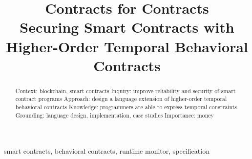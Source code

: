 \documentclass[10pt,conference]{IEEEtran}
\begin{document}
\title{Contracts for Contracts \\
  {\Large Securing Smart Contracts with Higher-Order Temporal Behavioral Contracts}
}

\author{ }


\maketitle


\begin{abstract}
  Context: blockchain, smart contracts
    Inquiry: improve reliability and security of smart contract programs
    Approach: design a language extension of higher-order temporal behavioral contracts
    Knowledge: programmers are able to express temporal constraints
    Grounding: language design, implementation, case studies
    Importance: money
\end{abstract}

\begin{IEEEkeywords}
  smart contracts, behavioral contracts, runtime monitor, specification
\end{IEEEkeywords}














\end{document}
